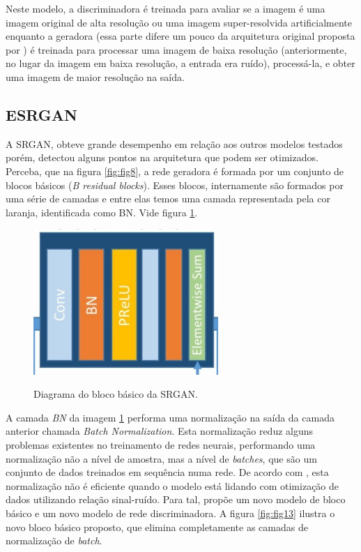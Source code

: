 Neste modelo, a discriminadora é treinada para avaliar se a imagem é uma imagem original de alta resolução ou uma imagem super-resolvida artificialmente \cite{ledig_photo-realistic_2017} enquanto a geradora (essa parte difere um pouco da arquitetura original proposta por ) é treinada para processar uma imagem de baixa resolução (anteriormente, no lugar da imagem em baixa resolução, a entrada era ruído), processá-la, e obter uma imagem de maior resolução na saída.

\subsection{ESRGAN}

A SRGAN, obteve grande desempenho em relação aos outros modelos testados porém,  detectou alguns pontos na arquitetura que podem ser otimizados. Perceba, que na figura \ref{fig:fig8}, a rede geradora é formada por um conjunto de blocos básicos (\textit{B residual blocks}). Esses blocos, internamente são formados por uma série de camadas e entre elas temos uma camada representada pela cor laranja, identificada como BN. Vide figura \ref{fig:fig12}.

\begin{figure}[H]
    \centering
    \caption{Diagrama do bloco básico da SRGAN.}
    \includegraphics[width=7cm]{fig/basic-block.png}
    \label{fig:fig12}
\end{figure}

A camada \textit{BN} da imagem \ref{fig:fig12} performa uma normalização na saída da camada anterior chamada \textit{Batch Normalization}. Esta normalização reduz alguns problemas existentes no treinamento de redes neurais, performando uma normalização não a nível de amostra, mas a nível de \textit{batches}, que são um conjunto de dados treinados em sequência numa rede. De acordo com , esta normalização não é eficiente quando o modelo está lidando com otimização de dados utilizando relação sinal-ruído. Para tal,  propõe um novo modelo de bloco básico e um novo modelo de rede discriminadora. A figura \ref{fig:fig13} ilustra o novo bloco básico proposto, que elimina completamente as camadas de normalização de \textit{batch}.
 
